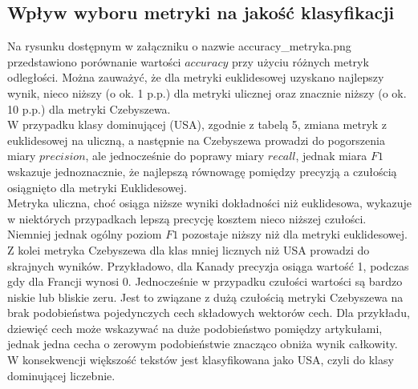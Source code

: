 \documentclass{article}
\begin{document}
\subsection{Wpływ wyboru metryki na jakość klasyfikacji}
Na rysunku dostępnym w załączniku o nazwie accuracy\_metryka.png przedstawiono porównanie wartości \(accuracy\) przy użyciu różnych metryk odległości. Można zauważyć, że dla metryki euklidesowej uzyskano najlepszy wynik, nieco niższy (o ok. 1 p.p.) dla metryki ulicznej oraz znacznie niższy (o ok. 10 p.p.) dla metryki Czebyszewa.\\
W przypadku klasy dominującej (USA), zgodnie z tabelą 5, zmiana metryk z euklidesowej na uliczną, a następnie na Czebyszewa prowadzi do pogorszenia miary \(precision\), ale jednocześnie do poprawy miary \(recall\), jednak miara \(F1\) wskazuje jednoznacznie, że najlepszą równowagę pomiędzy precyzją a czułością osiągnięto dla metryki Euklidesowej. \\
Metryka uliczna, choć osiąga niższe wyniki dokładności niż euklidesowa, wykazuje w niektórych przypadkach lepszą precycję kosztem nieco niższej czułości. Niemniej jednak ogólny poziom \(F1\) pozostaje niższy niż dla metryki euklidesowej. \\
Z kolei metryka Czebyszewa dla klas mniej licznych niż USA prowadzi do skrajnych wyników. Przykładowo, dla Kanady precyzja osiąga wartość 1, podczas gdy dla Francji wynosi 0. Jednocześnie w przypadku czułości wartości są bardzo niskie lub bliskie zeru. Jest to związane z dużą czułością metryki Czebyszewa na brak podobieństwa pojedynczych cech składowych wektorów cech. Dla przykładu, dziewięć cech może wskazywać na duże podobieństwo pomiędzy artykułami, jednak jedna cecha o zerowym podobieństwie znacząco obniża wynik całkowity. W konsekwencji większość tekstów jest klasyfikowana jako USA, czyli do klasy dominującej liczebnie.
\end{document}
